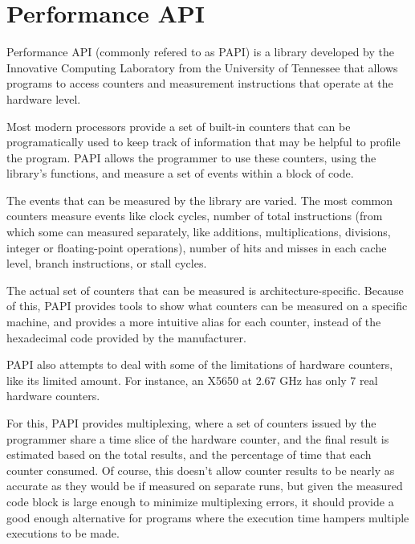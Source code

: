 \section{Performance API}
\label{sec:papi}


Performance API \cite{papi} (commonly refered to as PAPI) is a library developed by the Innovative Computing  Laboratory from the University of Tennessee that allows programs to access counters and measurement instructions that operate at the hardware level.

Most modern processors provide a set of built-in counters that can be programatically used to keep track of information that may be helpful to profile the program. PAPI allows the programmer to use these counters, using the library's functions, and measure a set of events within a block of code.

The events that can be measured by the library are varied. The most common counters measure events like clock cycles, number of total instructions (from which some can measured separately, like additions, multiplications, divisions, integer or floating-point operations), number of hits and misses in each cache level, branch instructions, or stall cycles.

The actual set of counters that can be measured is architecture-specific. Because of this, PAPI provides tools to show what counters can be measured on a specific machine, and provides a more intuitive alias for each counter, instead of the hexadecimal code provided by the manufacturer.

PAPI also attempts to deal with some of the limitations of hardware counters, like its limited amount. For instance, an \intel \xeon X5650 at 2.67 GHz has only 7 real hardware counters.

For this, PAPI provides multiplexing, where a set of counters issued by the programmer share a time slice of the hardware counter, and the final result is estimated based on the total results, and the percentage of time that each counter consumed. Of course, this doesn't allow counter results to be nearly as accurate as they would be if measured on separate runs, but given the measured code block is large enough to minimize multiplexing errors, it should provide a good enough alternative for programs where the execution time hampers multiple executions to be made.